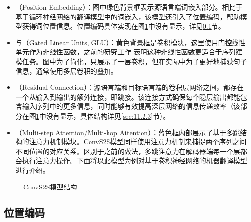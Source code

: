\begin{itemize}
\item {\small{}}（Position Embedding）：图中绿色背景框表示源语言端词嵌入部分。相比于基于循环神经网络的翻译模型中的词嵌入，该模型还引入了位置编码，帮助模型获得词位置信息。位置编码具体实现在图\ref{fig:11-12}中没有显示，详见\ref{sec:11.2.1}节。

\item {\small{}}与{\small{}}（Gated Linear Units, GLU）：黄色背景框是卷积模块，这里使用门控线性单元作为非线性函数，之前的研究工作 表明这种非线性函数更适合于序列建模任务。图中为了简化，只展示了一层卷积，但在实际中为了更好地捕获句子信息，通常使用多层卷积的叠加。

\item {\small{}}（Residual Connection）：源语言端和目标语言端的卷积层网络之间，都存在一个从输入到输出的额外连接，即跳接。该连接方式确保每个隐层输出都能包含输入序列中的更多信息，同时能够有效提高深层网络的信息传递效率（该部分在图\ref{fig:11-12}中没有显示，具体结构详见\ref{sec:11.2.3}节）。

\item {\small{}}（Multi-step Attention/Multi-hop Attention）：蓝色框内部展示了基于多跳结构的注意力机制模块。ConvS2S模型同样使用注意力机制来捕捉两个序列之间不同位置的对应关系。区别于之前的做法，多跳注意力在解码器端每一个层都会执行注意力操作。下面将以此模型为例对基于卷积神经网络的机器翻译模型进行介绍。
\end{itemize}

\begin{figure}[htp]
\centering

\caption{ConvS2S模型结构}
\label{fig:11-12}
\end{figure}


\subsection{位置编码}
\label{sec:11.2.1}

